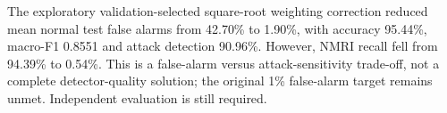 The exploratory validation-selected square-root weighting correction reduced mean normal test false alarms from 42.70\% to 1.90\%, with accuracy 95.44\%, macro-F1 0.8551 and attack detection 90.96\%. However, NMRI recall fell from 94.39\% to 0.54\%. This is a false-alarm versus attack-sensitivity trade-off, not a complete detector-quality solution; the original 1\% false-alarm target remains unmet. Independent evaluation is still required.
